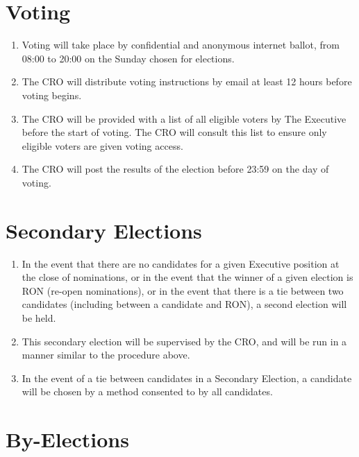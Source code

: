 \documentclass[11pt, a4paper]{article}
\begin{document}
\section{Voting}
\label{sec:voting}

\begin{enumerate}
	\item Voting will take place by confidential and anonymous internet ballot, from 08:00 to 20:00 on the Sunday chosen for elections.
    \item The CRO will distribute voting instructions by email at least 12 hours before voting begins.
    \item The CRO will be provided with a list of all eligible voters by The Executive before the start of voting. The CRO will consult this list to ensure only eligible voters are given voting access.
    \item The CRO will post the results of the election before 23:59 on the day of voting.
\end{enumerate}





\section{Secondary Elections}
\label{sec:secondary_elections}

\begin{enumerate}
	\item In the event that there are no candidates for a given Executive position at the close of nominations, or in the event that the winner of a given election is RON (re-open nominations), or in the event that there is a tie between two candidates (including between a candidate and RON),  a second election will be held.
    \item This secondary election will be supervised by the CRO, and will be run in a manner similar to the procedure above.
    \item In the event of a tie between candidates in a Secondary Election, a candidate will be chosen by a method consented to by all candidates.
\end{enumerate}





\section{By-Elections}
\label{sec:by_elections}
\end{document}
